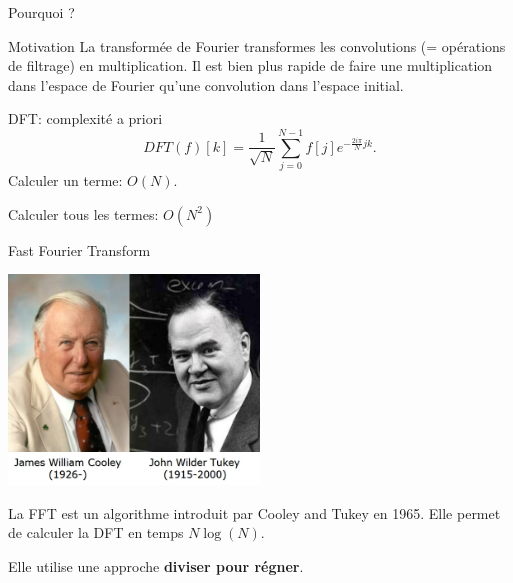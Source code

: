 \begin{frame}{Pourquoi ?}

\begin{block}{Motivation}
La transformée de Fourier transformes les convolutions (= opérations de filtrage) en multiplication. Il est bien plus rapide de faire une multiplication dans l'espace de Fourier qu'une convolution dans l'espace initial.
\end{block}



\end{frame}

\begin{frame}{DFT: complexité a priori}
\[DFT(f)[k] =  \frac{1}{\sqrt{N}}\sum_{j=0}^{N-1}f[j]e^{-\frac{2i\pi}{N} jk}.\]
Calculer un terme: $O(N)$.

\vspace{0.5cm}
Calculer tous les termes: $ O(N^2)$
\end{frame}

\begin{frame}{Fast Fourier Transform}

\begin{center}
\includegraphics[width=0.5\textwidth]{images/cooley_tukey.jpg}
\end{center}

La FFT est un algorithme introduit par Cooley and Tukey en 1965. Elle permet de calculer la DFT en temps $N \log(N)$.

Elle utilise une approche \textbf{diviser pour régner}.

\end{frame}

